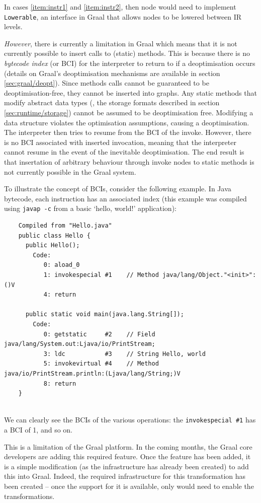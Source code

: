 	In cases \ref{item:instr1} and \ref{item:instr2}, then node would need to implement \texttt{Lowerable}, an interface in Graal that allows nodes to be lowered between IR levels.
	
	\textit{However}, there is currently a limitation in Graal which means that it is not currently possible to insert calls to (static) methods. This is because there is no \emph{bytecode index} (or BCI) for the interpreter to return to if a deoptimisation occurs (details on Graal's deoptimisation mechanisms are available in section \ref{sec:graal/deopt}). Since methods calls cannot be guaranteed to be deoptimisation-free, they cannot be inserted into graphs. Any static methods that modify abstract data types (\ie, the storage formats described in section \ref{sec:runtime/storage}) cannot be assumed to be deoptimisation free. Modifying a data structure violates the optimisation assumptions, causing a deoptimisation. The interpreter then tries to resume from the BCI of the invoke. However, there is no BCI associated with inserted invocation, meaning that the interpreter cannot resume in the event of the inevitable deoptimisation. The end result is that insertation of arbitrary behaviour through invoke nodes to static methods is not currently possible in the Graal system.
	
	To illustrate the concept of BCIs, consider the following example. In Java bytecode, each instruction has an associated index (this example was compiled using \texttt{javap -c} from a basic `hello, world!' application):
	
	\begin{verbatim}
	Compiled from "Hello.java"
	public class Hello {
	  public Hello();
	    Code:
	       0: aload_0       
	       1: invokespecial #1    // Method java/lang/Object."<init>":()V
	       4: return        
	
	  public static void main(java.lang.String[]);
	    Code:
	       0: getstatic     #2    // Field java/lang/System.out:Ljava/io/PrintStream;
	       3: ldc           #3    // String Hello, world
	       5: invokevirtual #4    // Method java/io/PrintStream.println:(Ljava/lang/String;)V
	       8: return        
	}
	
	\end{verbatim}
	
	We can clearly see the BCIs of the various operations: the \texttt{invokespecial \#1} has a BCI of 1, and so on.

	This is a limitation of the Graal platform. In the coming months, the Graal core developers are adding this required feature. Once the feature has been added, it is a simple modification (as the infrastructure has already been created) to add this into Graal. Indeed, the required infrastructure for this transformation has been created -- once the support for it is available, only would need to enable the transformations.
	
